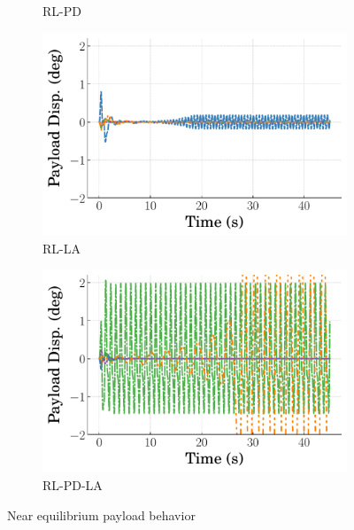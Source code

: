 \begin{figure}[t]
\begin{subfigure}[b]{0.49\textwidth}
    \caption{RL-PD}
    \label{subfig_chap3:dpcrane_RL_PD_near_equil_payload}
  \end{subfigure}
  \hfill
  \begin{subfigure}[b]{0.49\textwidth}
    \centering
    \includegraphics[width=\textwidth]{figures/figures_stability/time_responses_crane/dpcrane_RL_LA/Payload_displacement_0_init_300000_steps.pdf}
    \caption{RL-LA}
    \label{subfig_chap3:dpcrane_RL_LA_near_equil_payload}
  \end{subfigure}
  \hfill
  \begin{subfigure}[b]{0.49\textwidth}
      \centering
      \includegraphics[width=\textwidth]{figures/figures_stability/time_responses_crane/dpcrane_RL_PD_LA/Payload_displacement_0_init_300000_steps.pdf}
      \caption{RL-PD-LA}
      \label{subfig_chap3:dpcrane_RL_PD_LA_near_equil_payload}
  \end{subfigure}
  \hfill
  \caption{Near equilibrium payload behavior}
  \vspace{-0.2in}
  \label{fig_chap3:dpcrane_near_equil_payload}
\end{figure}
%
%

